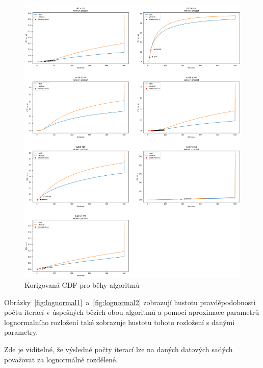 \documentclass[twoside,twocolumn]{article}
\begin{document}
    \begin{figure}[h]
        \includegraphics[width=\textwidth]{images/gsat_probsat_revcdf-2}
        \caption{Korigovaná CDF pro běhy algoritmů}
        \label{fig:revcdf2}
    \end{figure}

    Obrázky~\ref{fig:lognormal1}~a~\ref{fig:lognormal2} zobrazují hustotu pravděpodobnosti počtu iterací v úspešných bězích
    obou algoritmů a pomocí aproximace parametrů lognormalního rozložení také zobrazuje hustotu tohoto rozložení s danými parametry.

    Zde je viditelné, že výsledné počty iterací lze na daných datových sadých považovat za lognormálně rozdělené.
\end{document}

